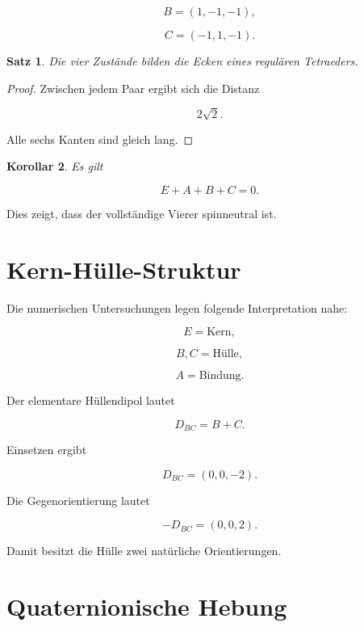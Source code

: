 \documentclass[11pt,a4paper]{article}
\newtheorem{satz}{Satz}[section]
\newtheorem{korollar}[satz]{Korollar}
\theoremstyle{definition}
\theoremstyle{remark}
\begin{document}
	\[
	B=(1,-1,-1),
	\]
	
	\[
	C=(-1,1,-1).
	\]
	
	\begin{satz}
		
		Die vier Zustände bilden die Ecken eines regulären Tetraeders.
		
	\end{satz}
	
	\begin{proof}
		
		Zwischen jedem Paar ergibt sich die Distanz
		
		\[
		2\sqrt2.
		\]
		
		Alle sechs Kanten sind gleich lang.
		
	\end{proof}
	
	\begin{korollar}
		
		Es gilt
		
		\[
		E+A+B+C=0.
		\]
		
	\end{korollar}
	
	Dies zeigt,
	dass der vollständige Vierer spinneutral ist.
	
	
	\section{Kern-Hülle-Struktur}
	
	Die numerischen Untersuchungen legen folgende Interpretation nahe:
	
	\[
	E=\text{Kern},
	\]
	
	\[
	B,C=\text{Hülle},
	\]
	
	\[
	A=\text{Bindung}.
	\]
	
	Der elementare Hüllendipol lautet
	
	\[
	D_{BC}=B+C.
	\]
	
	Einsetzen ergibt
	
	\[
	D_{BC}
	=
	(0,0,-2).
	\]
	
	Die Gegenorientierung lautet
	
	\[
	-D_{BC}
	=
	(0,0,2).
	\]
	
	Damit besitzt die Hülle zwei natürliche Orientierungen.
	
	
	\section{Quaternionische Hebung}
	
\end{document}
